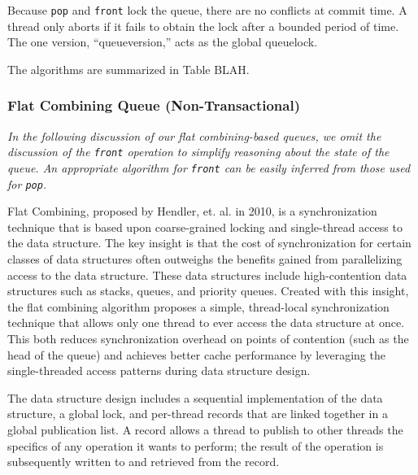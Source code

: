 Because \texttt{pop} and \texttt{front} lock the queue, there are no conflicts at commit time. A thread only aborts if it fails to obtain the lock after a bounded period of time. The one version, “queueversion,” acts as the global queuelock. 

The algorithms are summarized in Table BLAH.

\subsubsection{Flat Combining Queue (Non-Transactional)}

\emph{In the following discussion of our flat combining-based queues, we omit the discussion of the \texttt{front} operation to simplify reasoning about the state of the queue. An appropriate algorithm for \texttt{front} can be easily inferred from those used for \texttt{pop}.}

Flat Combining, proposed by Hendler, et. al. in 2010\cite{flatcombining}, is a synchronization technique that is based upon coarse-grained locking and single-thread access to the data structure. The key insight is that the cost of synchronization for certain classes of data structures often outweighs the benefits gained from parallelizing access to the data structure. These data structures include high-contention data structures such as stacks, queues, and priority queues. Created with this insight, the flat combining algorithm proposes a simple, thread-local synchronization technique that allows only one thread to ever access the data structure at once. This both reduces synchronization overhead on points of contention (such as the head of the queue) and achieves better cache performance by leveraging the single-threaded access patterns during data structure design.

The data structure design includes a sequential implementation of the data structure, a global lock, and per-thread records that are linked together in a global publication list. A record allows a thread to publish to other threads the specifics of any operation it wants to perform; the result of the operation is subsequently written to and retrieved from the record.

